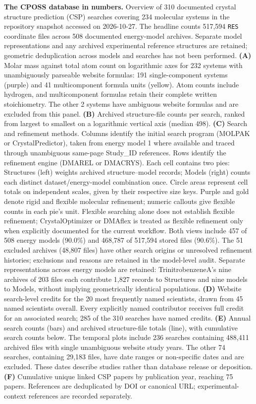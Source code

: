 \caption{
\textbf{The CPOSS database in numbers.}
Overview of 310 documented crystal structure prediction (CSP) searches
covering 234 molecular systems in the repository snapshot accessed
on 2026-10-27. The headline counts 517,594 \texttt{RES}
coordinate files across 508 documented energy-model archives.
Separate model representations and any archived experimental reference
structures are retained; geometric deduplication across models and
searches has not been performed.
\textbf{(A)} Molar mass against total atom count on logarithmic axes
for 232 systems with unambiguously parseable website formulas:
191 single-component systems (purple) and 41 multicomponent
formula units (yellow). Atom counts include hydrogen, and multicomponent
formulas retain their complete written stoichiometry. The other
2 systems have ambiguous website formulas and
are excluded from this panel.
\textbf{(B)} Archived structure-file counts per search, ranked from
largest to smallest on a logarithmic vertical axis (median 498).
\textbf{(C)} Search and refinement methods. Columns identify the initial
search program (MOLPAK or CrystalPredictor), taken from energy model 1
where available and traced through unambiguous same-page Study\_ID references.
Rows identify the refinement engine (DMAREL or DMACRYS). Each cell contains
two pies: Structures (left) weights archived structure--model records;
Models (right) counts each distinct dataset/energy-model combination once.
Circle areas represent cell totals on independent scales, given by their
respective size keys. Purple and gold denote rigid and flexible molecular
refinement; numeric callouts give flexible counts in each pie's unit.
Flexible searching alone does not establish flexible refinement;
CrystalOptimizer or DMAflex is treated as flexible refinement only when
explicitly documented for the current workflow. Both views include
457 of 508 energy models
(90.0\%) and
468,787 of 517,594 stored files
(90.6\%).
The 51 excluded archives (48,807 files) have
other search origins or unresolved refinement histories; exclusions and
reasons are retained in the model-level audit. Separate representations
across energy models are retained: TrinitrobenzeneA's nine archives of
203 files each contribute 1,827 records to Structures and nine models
to Models, without implying geometrically identical populations.
\textbf{(D)} Website search-level credits for the 20 most frequently
named scientists, drawn from 45 named scientists overall.
Every explicitly named contributor receives full credit for an associated
search; 285 of the 310 searches have named credits.
\textbf{(E)} Annual search counts (bars) and archived structure-file
totals (line), with cumulative search counts below. The temporal plots
include 236 searches containing 488,411 archived files with
single unambiguous website study years. The other 74 searches,
containing 29,183 files, have date ranges or non-specific
dates and are excluded. These dates describe studies rather than
database release or deposition.
\textbf{(F)} Cumulative unique linked CSP papers by publication year,
reaching 75 papers.
References are deduplicated by DOI or canonical URL; experimental-context
references are recorded separately.
}
\label{fig:database_in_numbers}
